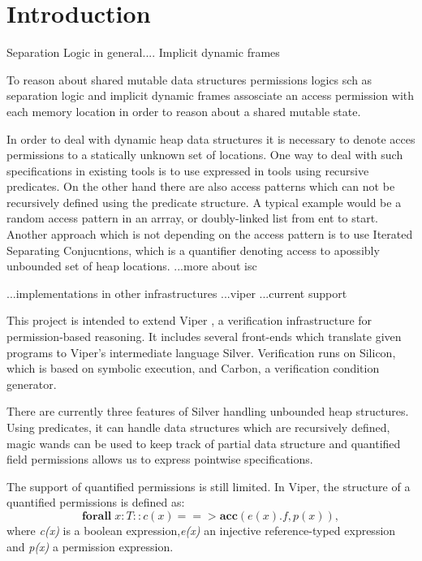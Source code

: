 \documentclass[12pt]{article}
\begin{document}
\maketitle

\section{Introduction}

Separation Logic in general....
Implicit dynamic frames

To reason about shared mutable data structures permissions logics sch as separation logic and implicit dynamic frames assosciate an access permission with each memory location in order to reason about a shared mutable state.

In order to deal with dynamic heap data structures it is necessary to denote acces permissions to a statically unknown set of locations. One way to deal with such specifications in existing tools is to use expressed in tools using recursive predicates. On the other hand there are also access patterns which can not be recursively defined using the predicate structure. A typical example would be a random access pattern in an arrray, or doubly-linked list from ent to start.
Another approach which is not depending on the access pattern is to use Iterated Separating Conjucntions, which is a quantifier denoting access to apossibly unbounded set of heap locations.
...more about isc

...implementations in other infrastructures
...viper
...current support

This project is intended to extend Viper \cite{viper}, a verification infrastructure for permission-based reasoning. It includes several front-ends which translate given programs to Viper's intermediate language Silver. Verification runs on Silicon, which is based on symbolic execution, and Carbon, a verification condition generator.

There are currently three features of Silver handling unbounded heap structures. Using predicates, it can handle data structures which are recursively defined, magic wands \cite{magicwand} can be used to keep track of partial data structure and quantified field permissions \cite{isc} allows us to express pointwise specifications. 

The support of quantified permissions is still limited. In Viper, the structure of a quantified permissions is defined as:
\newline 
\begin{equation}
	\mathbf{forall} \; x:T :: c(x) ==>\mathbf{acc}( e(x).f, p(x) ) ,
\end{equation}
where {\it c(x)} is  a boolean expression,{\it e(x)} an injective reference-typed expression and {\it p(x)} a permission expression.
\end{document}

